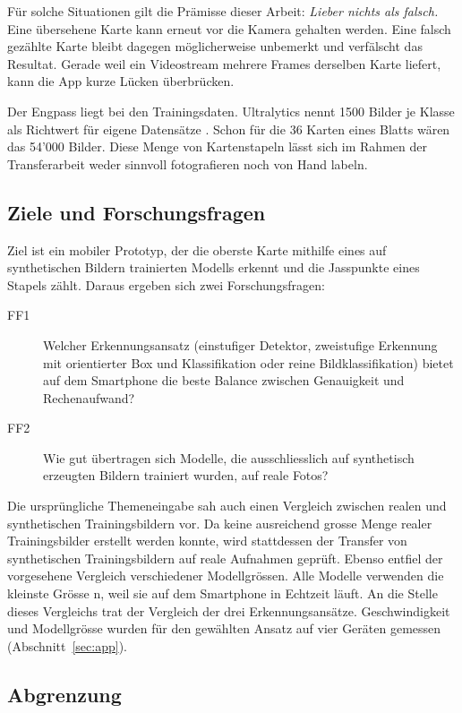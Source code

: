 Für solche Situationen gilt die Prämisse dieser Arbeit: \emph{Lieber
nichts als falsch.} Eine übersehene Karte kann erneut vor die Kamera
gehalten werden. Eine falsch gezählte Karte bleibt dagegen möglicherweise
unbemerkt und verfälscht das Resultat. Gerade weil ein Videostream mehrere
Frames derselben Karte liefert, kann die App kurze Lücken überbrücken.

Der Engpass liegt bei den Trainingsdaten. Ultralytics nennt 1500 Bilder je
Klasse als Richtwert für eigene Datensätze \cite{ultralytics2025tips}.
Schon für die 36 Karten eines Blatts wären das 54'000 Bilder. Diese Menge
von Kartenstapeln lässt sich im Rahmen der Transferarbeit weder sinnvoll
fotografieren noch von Hand labeln.

\subsection{Ziele und Forschungsfragen}\label{sec:ziele}

Ziel ist ein mobiler Prototyp, der die oberste Karte mithilfe eines auf
synthetischen Bildern trainierten Modells erkennt und die Jasspunkte eines
Stapels zählt. Daraus ergeben sich zwei Forschungsfragen:

\begin{description}
  \item[FF1] Welcher Erkennungsansatz (einstufiger Detektor, zweistufige
    Erkennung mit orientierter Box und Klassifikation oder reine
    Bildklassifikation) bietet auf dem Smartphone die beste Balance
    zwischen Genauigkeit und Rechenaufwand?
  \item[FF2] Wie gut übertragen sich Modelle, die ausschliesslich auf
    synthetisch erzeugten Bildern trainiert wurden, auf reale Fotos?
\end{description}

Die ursprüngliche Themeneingabe sah auch einen Vergleich zwischen realen
und synthetischen Trainingsbildern vor. Da keine ausreichend grosse Menge
realer Trainingsbilder erstellt werden konnte, wird stattdessen der
Transfer von synthetischen Trainingsbildern auf reale Aufnahmen geprüft.
Ebenso entfiel der vorgesehene Vergleich verschiedener Modellgrössen.
Alle Modelle verwenden die kleinste Grösse n, weil sie auf dem Smartphone
in Echtzeit läuft. An die Stelle dieses Vergleichs trat der Vergleich der
drei Erkennungsansätze. Geschwindigkeit und Modellgrösse wurden für den
gewählten Ansatz auf vier Geräten gemessen
(Abschnitt~\ref{sec:app}).

\subsection{Abgrenzung}\label{sec:abgrenzung}

